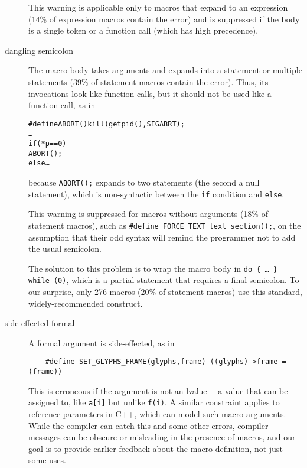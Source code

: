 \documentclass[10pt]{article}
\begin{document}
\begin{description}
        This warning is applicable only to macros that expand to an
        expression (14\% of expression macros contain the error) and is
        suppressed if the body is a single token or a function call (which
        has high precedence).

\item[dangling semicolon]\label{item:swallow-semicolon}
        The macro body takes arguments and expands into a statement or
        multiple statements (39\% of statement macros contain the error).
        Thus, its invocations look like function calls, but it should not
        be used like a function call, as in
\begin{alltt}
    #define ABORT() kill(getpid(),SIGABRT);
    \ldots
    if (*p == 0)
      ABORT();
    else \ldots
\end{alltt}
        because {\tt ABORT();} expands to two statements (the second a null
        statement), which is non-syntactic between the {\tt if} condition and
        {\tt else}.
        
        
        This warning is suppressed for macros without arguments (18\% of
        statement macros), such as {\tt \#define \verb|FORCE_TEXT|
        \verb|text_section|();}, on the assumption that their odd syntax
        will remind the programmer not to add the usual semicolon.

        
        The solution to this problem is to wrap the macro body in {\tt do
        \verb|{| \ldots\ \verb|}| while (0)}, which is a partial statement
      that requires a final semicolon.  To our surprise, only 276 macros
      (20\% of statement macros) use this standard, widely-recommended
      construct.

\item[side-effected formal]
        A formal argument is side-effected, as in
\begin{verbatim}
    #define SET_GLYPHS_FRAME(glyphs,frame) ((glyphs)->frame = (frame))
\end{verbatim}
        This is erroneous if the
        argument is not an lvalue\,---\,a value that can be assigned to, like
        {\tt a[i]} but unlike {\tt f(i)}.  A similar constraint applies to
        reference parameters in C++, which can model such macro arguments.
        While the compiler can catch this and some other errors, compiler
        messages can be obscure or misleading in the presence of macros,
        and our goal is to provide earlier feedback about the macro
        definition, not just some uses.


\end{description}
\end{document}
